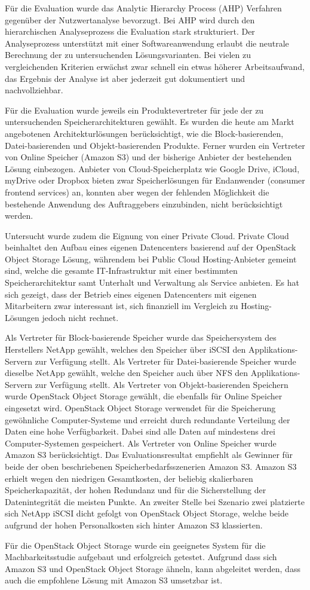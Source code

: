Für die Evaluation wurde das Analytic Hierarchy Process (AHP) Verfahren gegenüber der Nutzwertanalyse bevorzugt. Bei AHP wird durch den hierarchischen Analyseprozess die Evaluation stark strukturiert. Der Analyseprozess unterstützt mit einer Softwareanwendung erlaubt die neutrale Berechnung der zu untersuchenden Lösungsvarianten. Bei vielen zu vergleichenden Kriterien erwächst zwar schnell ein etwas höherer Arbeitsaufwand, das Ergebnis der Analyse ist aber jederzeit gut dokumentiert und nachvollziehbar.

Für die Evaluation wurde jeweils ein Produktevertreter für jede der zu untersuchenden Speicherarchitekturen gewählt. Es wurden die heute am Markt angebotenen Architekturlösungen berücksichtigt, wie die Block-basierenden, Datei-basierenden und Objekt-basierenden Produkte. Ferner wurden ein Vertreter von Online Speicher (Amazon S3) und der bisherige Anbieter der bestehenden Lösung einbezogen. Anbieter von Cloud-Speicherplatz wie Google Drive, iCloud, myDrive oder Dropbox bieten zwar Speicherlösungen für Endanwender (consumer frontend services) an, konnten aber wegen der fehlenden Möglichkeit die bestehende Anwendung des Auftraggebers einzubinden, nicht berücksichtigt werden. 

Untersucht wurde zudem die Eignung von einer Private Cloud. Private Cloud beinhaltet den Aufbau eines eigenen Datencenters basierend auf der OpenStack Object Storage Lösung, währendem bei Public Cloud Hosting-Anbieter gemeint sind, welche die gesamte IT-Infrastruktur mit einer bestimmten Speicherarchitektur samt Unterhalt und Verwaltung als Service anbieten. Es hat sich gezeigt, dass der Betrieb eines eigenen Datencenters mit eigenen Mitarbeitern zwar interessant ist, sich finanziell im Vergleich zu Hosting-Lösungen jedoch nicht rechnet.

Als Vertreter für Block-basierende Speicher wurde das Speichersystem des Herstellers NetApp gewählt, welches den Speicher über iSCSI den Applikations-Servern zur Verfügung stellt. Als Vertreter für Datei-basierende Speicher wurde dieselbe NetApp gewählt, welche den Speicher auch über NFS den Applikations-Servern zur Verfügung stellt. Als Vertreter von Objekt-basierenden Speichern wurde OpenStack Object Storage gewählt, die ebenfalls für Online Speicher eingesetzt wird. OpenStack Object Storage verwendet für die Speicherung gewöhnliche Computer-Systeme und erreicht durch redundante Verteilung der Daten eine hohe Verfügbarkeit. Dabei sind alle Daten auf mindestens drei Computer-Systemen gespeichert. Als Vertreter von Online Speicher wurde Amazon S3 berücksichtigt.
Das Evaluationsresultat empfiehlt als Gewinner für beide der oben beschriebenen Speicherbedarfsszenerien Amazon S3. Amazon S3 erhielt wegen den niedrigen Gesamtkosten, der beliebig skalierbaren Speicherkapazität, der hohen Redundanz und für die Sicherstellung der Datenintegrität die meisten Punkte. An zweiter Stelle bei Szenario zwei platzierte sich NetApp iSCSI dicht gefolgt von OpenStack Object Storage, welche beide aufgrund der hohen Personalkosten sich hinter Amazon S3 klassierten.

Für die OpenStack Object Storage wurde ein geeignetes System für die Machbarkeitsstudie aufgebaut und erfolgreich getestet. Aufgrund dass sich Amazon S3 und OpenStack Object Storage ähneln, kann abgeleitet werden, dass auch die empfohlene Lösung mit Amazon S3 umsetzbar ist. 